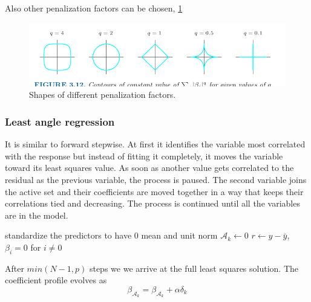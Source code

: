 \documentclass[12pt, letterpaper]{article}
\theoremstyle{definition}
\begin{document}
Also other penalization factors can be chosen, \ref{penalization}

\begin{figure}
\label{penalization}
\includegraphics[scale=0.4]{img/penalization}
\caption{Shapes of different penalization factors.}
\end{figure}

\subsubsection{Least angle regression}
It is similar to forward stepwise. At first it identifies the variable most correlated with the response but instead of fitting it completely, it moves the variable toward its least squares value. As soon as another value gets correlated to the residual as the previous variable, the process is paused. The second variable joins the active set and their coefficients are moved together in a way that keeps their correlations tied and decreasing. The process is continued until all the variables are in the model.
\begin{algorithm}[!ht]
standardize the predictors to have $0$ mean and unit norm\;
$\mathcal{A}_k\leftarrow 0$\;
$r\leftarrow y-\bar{y}$, $\beta_i=0$ for $i\ne0$\;
\end{algorithm}
After $min(N-1,p)$ steps we we arrive at the full least squares solution.
The coefficient profile evolves as
\begin{equation}
\beta_{\mathcal{A}_k} =  \beta_{\mathcal{A}_k} + \alpha \delta_k
\end{equation}
\end{document}
